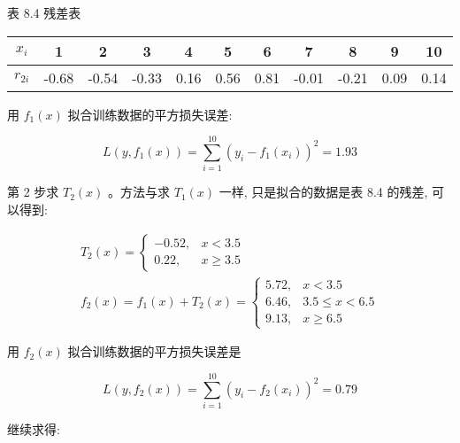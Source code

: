 \documentclass[10pt]{article}
\begin{document}
表 8.4 残差表

\begin{center}
\begin{tabular}{ccccccccccc}
\hline
$x_{i}$ & 1 & 2 & 3 & 4 & 5 & 6 & 7 & 8 & 9 & 10 \\
\hline
$r_{2 i}$ & -0.68 & -0.54 & -0.33 & 0.16 & 0.56 & 0.81 & -0.01 & -0.21 & 0.09 & 0.14 \\
\hline
\end{tabular}
\end{center}

用 $f_{1}(x)$ 拟合训练数据的平方损失误差:

$$
L\left(y, f_{1}(x)\right)=\sum_{i=1}^{10}\left(y_{i}-f_{1}\left(x_{i}\right)\right)^{2}=1.93
$$

第 2 步求 $T_{2}(x)$ 。方法与求 $T_{1}(x)$ 一样, 只是拟合的数据是表 8.4 的残差, 可以得到:

$$
\begin{gathered}
T_{2}(x)= \begin{cases}-0.52, & x<3.5 \\
0.22, & x \geqslant 3.5\end{cases} \\
f_{2}(x)=f_{1}(x)+T_{2}(x)= \begin{cases}5.72, & x<3.5 \\
6.46, & 3.5 \leqslant x<6.5 \\
9.13, & x \geqslant 6.5\end{cases}
\end{gathered}
$$

用 $f_{2}(x)$ 拟合训练数据的平方损失误差是

$$
L\left(y, f_{2}(x)\right)=\sum_{i=1}^{10}\left(y_{i}-f_{2}\left(x_{i}\right)\right)^{2}=0.79
$$

继续求得:
\end{document}
